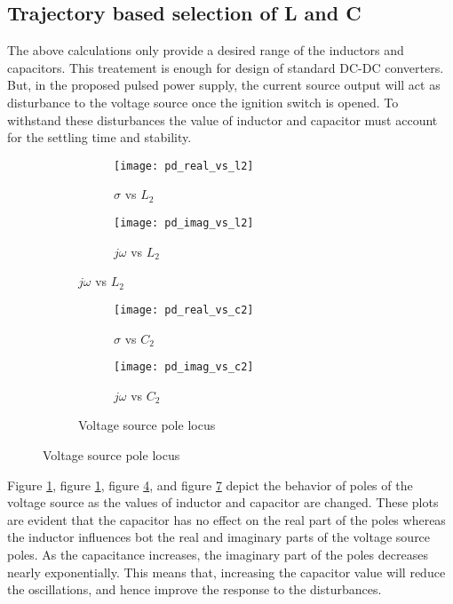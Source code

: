 \subsection{Trajectory based selection of L and C}
    The above calculations only provide a desired range of the inductors and capacitors. This treatement is enough for design of standard DC-DC converters. But, in the proposed pulsed power supply, the current source output will act as disturbance to the voltage source once the ignition switch is opened. To withstand these disturbances the value of inductor and capacitor must account for the settling time and stability.
	\begin{figure}[h]
	\begin{subfigure}{\textwidth}
		\begin{subfigure}{0.49\textwidth}
		\centering
			\texttt{[image: pd\_real\_vs\_l2]}
			\caption{$\sigma$ vs $L_2$}
			\label{fig:pd_real_vs_l2}
		\end{subfigure}
		\begin{subfigure}{0.49\textwidth}
			\centering
			\texttt{[image: pd\_imag\_vs\_l2]}
			\caption{$j\omega$ vs $L_2$}
			\label{fig:pd_imag_vs_l2}
		\end{subfigure}
	\end{subfigure}
	\begin{subfigure}{\textwidth}
			\begin{subfigure}{0.49\textwidth}
			\texttt{[image: pd\_real\_vs\_c2]}
			\caption{$\sigma$ vs $C_2$}
			\label{fig:pd_real_vs_c2}
		\end{subfigure}
		\begin{subfigure}{0.49\textwidth}
			\texttt{[image: pd\_imag\_vs\_c2]}
			\caption{$j\omega$ vs $C_2$}
			\label{fig:pd_imag_vs_c2}
		\end{subfigure}
		\caption{Voltage source pole locus}
	\end{subfigure}
	\end{figure}
	Figure \ref{fig:pd_real_vs_l2}, figure \ref{fig:pd_real_vs_l2}, figure \ref{fig:pd_real_vs_c2}, and figure \ref{fig:pd_imag_vs_c2} depict the behavior of poles of the voltage source as the values of inductor and capacitor are changed. These plots are evident that the capacitor has no effect on the real part of the poles whereas the inductor influences bot the real and imaginary parts of the voltage source poles. As the capacitance increases, the imaginary part of the poles decreases nearly exponentially. This means that, increasing the capacitor value will reduce the oscillations, and hence improve the response to the disturbances.
	
